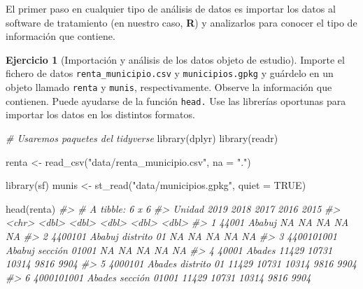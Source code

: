 \documentclass[
]{book}
\newenvironment{Shaded}{\begin{snugshade}}{\end{snugshade}}
\newcommand{\AttributeTok}[1]{\textcolor[rgb]{0.77,0.63,0.00}{#1}}
\newcommand{\CommentTok}[1]{\textcolor[rgb]{0.56,0.35,0.01}{\textit{#1}}}
\newcommand{\ConstantTok}[1]{\textcolor[rgb]{0.00,0.00,0.00}{#1}}
\newcommand{\FunctionTok}[1]{\textcolor[rgb]{0.00,0.00,0.00}{#1}}
\newcommand{\NormalTok}[1]{#1}
\newcommand{\OtherTok}[1]{\textcolor[rgb]{0.56,0.35,0.01}{#1}}
\newcommand{\StringTok}[1]{\textcolor[rgb]{0.31,0.60,0.02}{#1}}
\theoremstyle{definition}
\theoremstyle{definition}
\theoremstyle{definition}
\newtheorem{exercise}{Ejercicio}[chapter]
\theoremstyle{definition}
\theoremstyle{remark}
\begin{document}
El primer paso en cualquier tipo de análisis de datos es importar los datos al
software de tratamiento (en nuestro caso, \textbf{R}) y analizarlos para conocer el
tipo de información que contiene.

\begin{exercise}[Importación y análisis de los datos objeto de estudio]
\protect\hypertarget{exr:ex16}{}\label{exr:ex16}Importe el fichero de datos \texttt{renta\_municipio.csv} y \texttt{municipios.gpkg} y guárdelo
en un objeto llamado \texttt{renta} y \texttt{munis}, respectivamente. Observe la información
que contienen. Puede ayudarse de la función \texttt{head.} Use las librerías oportunas
para importar los datos en los distintos formatos.
\end{exercise}

\begin{Shaded}
\begin{Highlighting}[]
\CommentTok{\# Usaremos paquetes del tidyverse}
\FunctionTok{library}\NormalTok{(dplyr)}
\FunctionTok{library}\NormalTok{(readr)}

\NormalTok{renta }\OtherTok{\textless{}{-}} \FunctionTok{read\_csv}\NormalTok{(}\StringTok{"data/renta\_municipio.csv"}\NormalTok{, }\AttributeTok{na =} \StringTok{"."}\NormalTok{)}
\end{Highlighting}
\end{Shaded}

\begin{Shaded}
\begin{Highlighting}[]
\FunctionTok{library}\NormalTok{(sf)}
\NormalTok{munis }\OtherTok{\textless{}{-}} \FunctionTok{st\_read}\NormalTok{(}\StringTok{"data/municipios.gpkg"}\NormalTok{, }\AttributeTok{quiet =} \ConstantTok{TRUE}\NormalTok{)}
\end{Highlighting}
\end{Shaded}

\begin{Shaded}
\begin{Highlighting}[]
\FunctionTok{head}\NormalTok{(renta)}
\CommentTok{\#\textgreater{} \# A tibble: 6 x 6}
\CommentTok{\#\textgreater{}   Unidad                          \textasciigrave{}2019\textasciigrave{} \textasciigrave{}2018\textasciigrave{} \textasciigrave{}2017\textasciigrave{} \textasciigrave{}2016\textasciigrave{} \textasciigrave{}2015\textasciigrave{}}
\CommentTok{\#\textgreater{}   \textless{}chr\textgreater{}                            \textless{}dbl\textgreater{}  \textless{}dbl\textgreater{}  \textless{}dbl\textgreater{}  \textless{}dbl\textgreater{}  \textless{}dbl\textgreater{}}
\CommentTok{\#\textgreater{} 1 44001 Ababuj                        NA     NA     NA     NA     NA}
\CommentTok{\#\textgreater{} 2 4400101 Ababuj distrito 01          NA     NA     NA     NA     NA}
\CommentTok{\#\textgreater{} 3 4400101001 Ababuj sección 01001     NA     NA     NA     NA     NA}
\CommentTok{\#\textgreater{} 4 40001 Abades                     11429  10731  10314   9816   9904}
\CommentTok{\#\textgreater{} 5 4000101 Abades distrito 01       11429  10731  10314   9816   9904}
\CommentTok{\#\textgreater{} 6 4000101001 Abades sección 01001  11429  10731  10314   9816   9904}
\end{Highlighting}
\end{Shaded}
\end{document}

